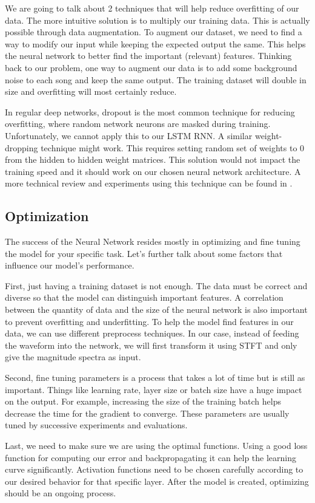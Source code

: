 \documentclass[../Thesis.tex]{subfiles}
\begin{document}
We are going to talk about 2 techniques that will help reduce overfitting of our data. The more intuitive solution is to multiply our training data. This is actually possible through data augmentation. To augment our dataset, we need to find a way to modify our input while keeping the expected output the same. This helps the neural network to better find the important (relevant) features. Thinking back to our problem, one way to augment our data is to add some background noise to each song and keep the same output. The training dataset will double in size and overfitting will most certainly reduce.

In regular deep networks, dropout is the most common technique for reducing overfitting, where random network neurons are masked during training. Unfortunately, we cannot apply this to our LSTM RNN. A similar weight-dropping technique might work. This requires setting random set of weights to 0 from the hidden to hidden weight matrices. This solution would not impact the training speed and it should work on our chosen neural network architecture. A more technical review and experiments using this technique can be found in \cite{stephen} .


\subsection {Optimization}

The success of the Neural Network resides mostly in optimizing and fine tuning the model for your specific task. Let’s further talk about some factors that influence our model’s performance.

First, just having a training dataset is not enough. The data must be correct and diverse so that the model can distinguish important features. A correlation between the quantity of data and the size of the neural network is also important to prevent overfitting and underfitting. To help the model find features in our data, we can use different preprocess techniques. In our case, instead of feeding the waveform into the network, we will first transform it using STFT and only give the magnitude spectra as input.

Second, fine tuning parameters is a process that takes a lot of time but is still as important. Things like learning rate, layer size or batch size have a huge impact on the output. For example, increasing the size of the training batch helps decrease the time for the gradient to converge. These parameters are usually tuned by successive experiments and evaluations. 

Last, we need to make sure we are using the optimal functions. Using a good loss function for computing our error and backpropagating it can help the learning curve significantly. Activation functions need to be chosen carefully according to our desired behavior for that specific layer. After the model is created, optimizing should be an ongoing process.
\end{document}

